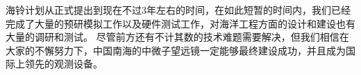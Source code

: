 海铃计划从正式提出到现在不过3年左右的时间，在如此短暂的时间内，我们已经完成了大量的预研模拟工作以及硬件测试工作，对海洋工程方面的设计和建设也有大量的调研和测试。
尽管前方还有不计其数的技术难题需要解决，但我们相信在大家的不懈努力下，中国南海的中微子望远镜一定能够最终建设成功，并且成为国际上领先的观测设备。